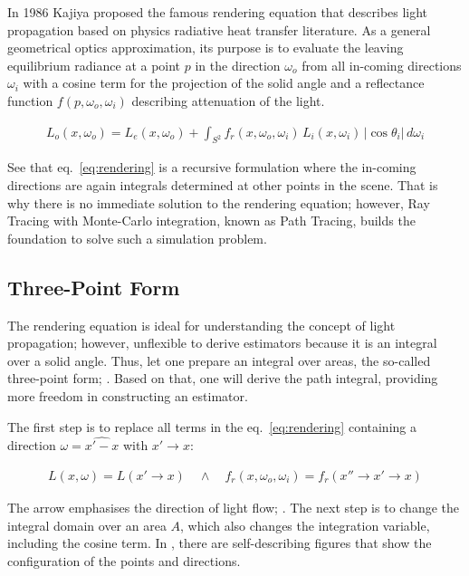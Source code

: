 In 1986 Kajiya \cite{kajiya_rendering_1986} proposed the famous rendering equation that describes light propagation based on physics radiative heat transfer literature.
As a general geometrical optics approximation, its purpose is to evaluate the leaving equilibrium radiance at a point $p$ in the direction $\omega_o$ from all in-coming directions $\omega_i$ with a cosine term for the projection of the solid angle and a reflectance function $f(p, \omega_o, \omega_i)$ describing attenuation of the light.

\begin{align}
    L_o(x,\omega_o)=L_e(x,\omega_o)+\int_{S^2}f_r(x,\omega_o,\omega_i)\,L_i(x,\omega_i)\,\left|\cos\theta_i\right|\,d\omega_i
    \label{eq:rendering}
\end{align}

See that eq.~\ref{eq:rendering} is a recursive formulation where the in-coming directions are again integrals determined at other points in the scene.
That is why there is no immediate solution to the rendering equation; however, Ray Tracing with Monte-Carlo integration, known as Path Tracing, builds the foundation to solve such a simulation problem.

\subsection*{Three-Point Form}

The rendering equation is ideal for understanding the concept of light propagation; however, unflexible to derive estimators because it is an integral over a solid angle.
Thus, let one prepare an integral over areas, the so-called three-point form; \cite{veach_robust_1997}.
Based on that, one will derive the path integral, providing more freedom in constructing an estimator.

The first step is to replace all terms in the eq.~\ref{eq:rendering} containing a direction $\omega=\widehat{x'-x}$ with $x'\rightarrow x$:

\begin{align*}
    L(x,\omega)=L(x'\rightarrow x)\quad\wedge\quad f_r(x,\omega_o,\omega_i)=f_r(x''\rightarrow x'\rightarrow x)
\end{align*}

The arrow emphasises the direction of light flow; \cite{veach_robust_1997}.
The next step is to change the integral domain over an area $A$, which also changes the integration variable, including the cosine term.
In \cite{kajiya_rendering_1986}, there are self-describing figures that show the configuration of the points and directions.

